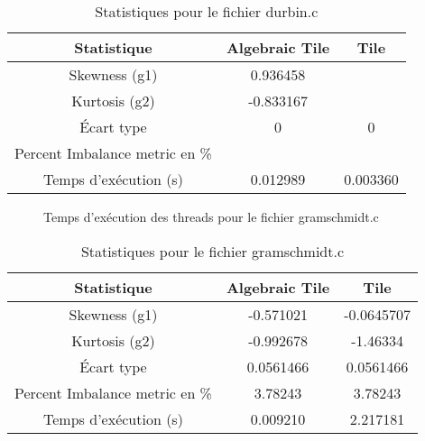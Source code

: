 \documentclass{article}
\begin{document}
\begin{table}[htbp]
  \centering
  \caption{Statistiques pour le fichier durbin.c}
  \begin{tabular}{|c|c|c|}
    \hline
    Statistique & Algebraic Tile & Tile \\ 
    \hline
    Skewness (g1) & 0.936458 &  \\ 
    Kurtosis (g2) & -0.833167 &  \\ 
    Écart type & 0 & 0 \\ 
    Percent Imbalance metric en \% &  &  \\ 
    Temps d'exécution (s) &  0.012989      &  0.003360    \\ 
    \hline
  \end{tabular}
\end{table}
\newpage

\begin{figure}
  \centering
  \caption{Temps d'exécution des threads pour le fichier gramschmidt.c}
  \label{fig:gramschmidt.c}
\end{figure}

\begin{table}[htbp]
  \centering
  \caption{Statistiques pour le fichier gramschmidt.c}
  \begin{tabular}{|c|c|c|}
    \hline
    Statistique & Algebraic Tile & Tile \\ 
    \hline
    Skewness (g1) & -0.571021 & -0.0645707 \\ 
    Kurtosis (g2) & -0.992678 & -1.46334 \\ 
    Écart type & 0.0561466 & 0.0561466 \\ 
    Percent Imbalance metric en \% & 3.78243 & 3.78243 \\ 
    Temps d'exécution (s) &  0.009210        &  2.217181    \\ 
    \hline
  \end{tabular}
\end{table}
\newpage
\end{document}
